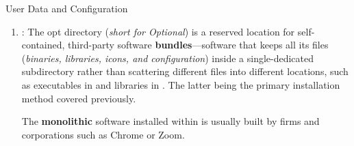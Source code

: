 \documentclass[10pt]{article}
\begin{document}
\begin{core}{User Data and Configuration}
\begin{enumerate}
\begin{itemize}
          At face value, the subdirectories within  are an exact mirror of subdirectories of : , , , and .

          \item {} is the central storage lcoation for \textbf{read-only, architecture-independent data} such as ---manual pages for different executable commands---and ---general documentation, license agreements, and README files for every software package installed. Other static files and directories regarding fonts, timezones, and icons for the operating system are stored here too.

          \item {} stores  files (\textit{C/C++ header files}) which provides the technical definitions requred to compile software that links to system libraries.

          \item {} contains the source code (\textit{the human-readable C and Assembly code}) of the operating system's components, most notably the Linux Kernel . 

        \end{itemize}

        \item {}: The opt directory (\textit{short for Optional}) is a reserved location for self-contained, third-party software \textbf{bundles}---software that keeps all its files (\textit{binaries, libraries, icons, and configuration}) inside a single-dedicated subdirectory rather than scattering different files into different locations, such as executables in  and libraries in . The latter being the primary installation method covered previously.        

        The \textbf{monolithic} software installed within  is usually built by firms and corporations such as Chrome or Zoom.

      \end{enumerate}

    \end{core}
\end{document}
